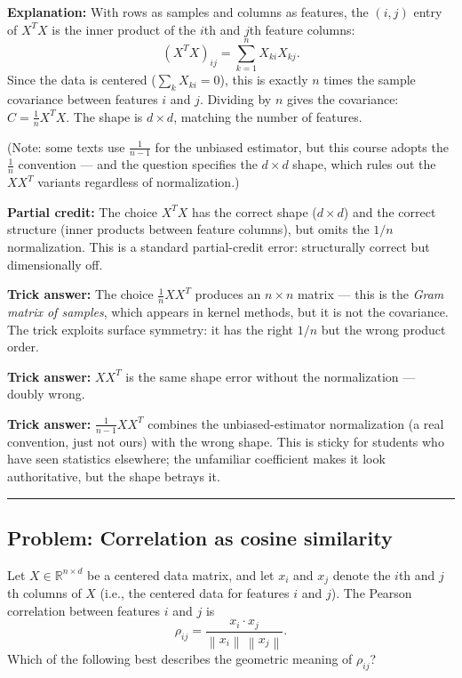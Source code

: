 \documentclass[12pt]{amsart}
\newcommand{\divider}{
  \vspace{-1em}
  \noindent
  \raisebox{-0.15ex}{\textbullet}%
  \hspace{0.5em}%
  \rule[0.5ex]{0.95\textwidth}{1.0pt}%
  \hspace{0.5em}%
  \raisebox{-0.15ex}{\textbullet}%
  \vspace{0em}
}
\newcommand{\norm}[1]{\left\|#1\right\|}
\begin{document}
\textbf{Explanation:}
With rows as samples and columns as features, the $(i,j)$ entry of
$X^T X$ is the inner product of the $i$th and $j$th feature columns:
$$
(X^T X)_{ij} = \sum_{k=1}^n X_{ki} X_{kj}.
$$
Since the data is centered ($\sum_k X_{ki} = 0$), this is exactly $n$ times
the sample covariance between features $i$ and $j$. Dividing by $n$ gives
the covariance: $C = \frac{1}{n} X^T X$. The shape is $d \times d$,
matching the number of features.

(Note: some texts use $\frac{1}{n-1}$ for the unbiased estimator, but this
course adopts the $\frac{1}{n}$ convention --- and the question specifies
the $d \times d$ shape, which rules out the $X X^T$ variants regardless
of normalization.)

\textbf{Partial credit:}
The choice $X^T X$ has the correct shape ($d \times d$) and the correct
structure (inner products between feature columns), but omits the $1/n$
normalization. This is a standard partial-credit error: structurally
correct but dimensionally off.

\textbf{Trick answer:}
The choice $\frac{1}{n} X X^T$ produces an $n \times n$ matrix --- this
is the \emph{Gram matrix of samples}, which appears in kernel methods, but
it is not the covariance. The trick exploits surface symmetry: it has the
right $1/n$ but the wrong product order.

\textbf{Trick answer:}
$X X^T$ is the same shape error without the normalization --- doubly wrong.

\textbf{Trick answer:}
$\frac{1}{n-1} X X^T$ combines the unbiased-estimator normalization (a
real convention, just not ours) with the wrong shape. This is sticky for
students who have seen statistics elsewhere; the unfamiliar coefficient
makes it look authoritative, but the shape betrays it.

\divider

\subsection*{Problem: Correlation as cosine similarity}

Let $X \in \mathbb{R}^{n \times d}$ be a centered data matrix, and let $x_i$
and $x_j$ denote the $i$th and $j$th columns of $X$ (i.e., the centered
data for features $i$ and $j$). The Pearson correlation between features
$i$ and $j$ is
$$
\rho_{ij} = \frac{x_i \cdot x_j}{\norm{x_i}\, \norm{x_j}}.
$$
Which of the following best describes the geometric meaning of $\rho_{ij}$?
\end{document}
